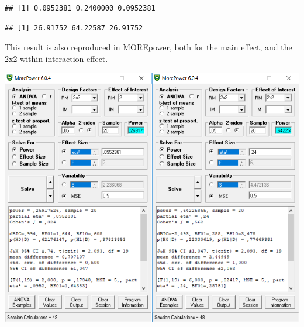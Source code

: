 \documentclass[]{book}
\newenvironment{Shaded}{\begin{snugshade}}{\end{snugshade}}
\newcommand{\NormalTok}[1]{#1}
\newcommand{\OperatorTok}[1]{\textcolor[rgb]{0.81,0.36,0.00}{\textbf{#1}}}
\begin{document}
\begin{verbatim}
## [1] 0.0952381 0.2400000 0.0952381
\end{verbatim}

\begin{Shaded}
\end{Shaded}

\begin{verbatim}
## [1] 26.91752 64.22587 26.91752
\end{verbatim}

This result is also reproduced in MOREpower, both for the main effect, and the 2x2 within interaction effect.

\includegraphics{screenshots/morepower_6.png}


\end{document}
